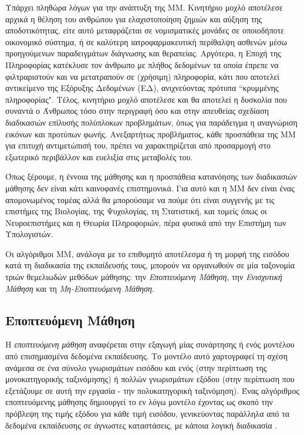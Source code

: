 Υπάρχει πληθώρα λόγων για την ανάπτυξη της ΜΜ. Κινητήριο μοχλό αποτέλεσε αρχικά η θέληση του ανθρώπου για ελαχιστοποίηση ζημιών και αύξηση της αποδοτικότητας, είτε αυτό μεταφράζεται σε νομισματικές μονάδες σε οποιοδήποτε οικονομικό σύστημα, ή σε καλύτερη ιατροφαρμακευτική περίθαλψη ασθενών μέσω προηγούμενων παραδειγμάτων διάγνωσης και θεραπείας. Αργότερα, η Εποχή της Πληροφορίας κατέκλυσε τον άνθρωπο με πλήθος δεδομένων τα οποία έπρεπε να φιλτραριστούν και να μετατραπούν σε (χρήσιμη) πληροφορία, κάτι που αποτελεί αντικείμενο της Εξόρυξης Δεδομένων (ΕΔ), ανιχνεύοντας πρότυπα “κρυμμένης πληροφορίας". Τέλος, κινητήριο μοχλό αποτέλεσε και θα αποτελεί η δυσκολία που συναντά ο Άνθρωπος τόσο στην περιγραφή όσο και στην απευθείας σχεδίαση διαδικασιών επίλυσής πολύπλοκων προβλημάτων, όπως για παράδειγμα η αναγνώριση εικόνων και προτύπων φωνής. Ανεξαρτήτως προβλήματος, κάθε προσπάθεια της ΜΜ για επιτυχή αντιμετώπισή του, πρέπει να χαρακτηρίζεται από προσαρμογή στο εξωτερικό περιβάλλον και ευελιξία στις μεταβολές του. 

Όπως ξέρουμε, η έννοια της μάθησης και η προσπάθεια κατανόησης των διαδικασιών μάθησης δεν είναι κάτι καινοφανές επιστημονικά. Για αυτό και η ΜΜ δεν είναι ένας απομονωμένος τομέας αλλά θα μπορούσαμε να πούμε ότι είναι συγγενής με τις επιστήμες της Βιολογίας, της Ψυχολογίας, τη Στατιστική, και τομείς όπως οι Νευροεπιστήμες και η Θεωρία Πληροφοριών, πέρα φυσικά από την Επιστήμη των Υπολογιστών. 

Οι αλγόριθμοι ΜΜ, ανάλογα με το επιθυμητό αποτέλεσμα ή τη μορφή της εισόδου κατά τη διαδικασία της εκπαίδευσής τους, μπορούν να οργανωθούν σε μία ταξονομία τριών θεμελιωδών μεθόδων μάθησης: την \emph{Εποπτευόμενη Μάθηση}, την \emph{Ενισχυτική Μάθηση} και τη \emph{Μη-Εποπτευόμενη Μάθηση}.

\subsection{Εποπτευόμενη Μάθηση}
Η \emph{εποπτευόμενη μάθηση} αναφέρεται στην εξαγωγή μίας συνάρτησης ή ενός μοντέλου από επισημασμένα δεδομένα εκπαίδευσης. Το μοντέλο αυτό χαρτογραφεί τη σχέση ανάμεσα σε ένα σύνολο γνωρισμάτων εισόδου και ενός (στην περίπτωση της μονοκατηγορικής ταξινόμησης) ή πολλών γνωρισμάτων εξόδου (στην περίπτωση που εξετάζουμε σε αυτή την εργασία - την πολυκατηγορική ταξινόμηση). Ένας αλγόριθμος εποπτευόμενης μάθησης δημιουργεί το εν λόγω μοντέλο έχοντας ως σκοπό την πρόβλεψη της τιμής εξόδου για κάθε τιμή εισόδου, γενικεύοντας παράλληλα από τα δεδομένα εκπαίδευσης σε άγνωστες καταστάσεις, με κάποια λογική διαδικασία \cite{tzima12}. 

